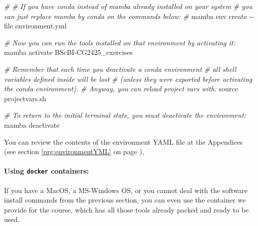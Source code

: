 \documentclass[10pt,a4paper,]{article}
\newenvironment{Shaded}{}{}
\newcommand{\BuiltInTok}[1]{#1}
\newcommand{\CommentTok}[1]{\textcolor[rgb]{0.38,0.63,0.69}{\textit{#1}}}
\newcommand{\ExtensionTok}[1]{#1}
\newcommand{\NormalTok}[1]{#1}
\begin{document}
\begin{Shaded}
\begin{Highlighting}[]
\CommentTok{\#}
\CommentTok{\# If you have conda instead of mamba already installed on your system}
\CommentTok{\# you can just replace \textquotesingle{}mamba\textquotesingle{} by \textquotesingle{}conda\textquotesingle{} on the commands below:}
\CommentTok{\#}
\ExtensionTok{mamba}\NormalTok{ env create {-}{-}file environment.yml}

\CommentTok{\# Now you can run the tools installed on that environment by activating it:}
\ExtensionTok{mamba}\NormalTok{ activate BScBI{-}CG2425\_exercises}

\CommentTok{\# Remember that each time you deactivate a conda environment}
\CommentTok{\# all shell variables defined inside will be lost}
\CommentTok{\# (unless they were exported before activating the conda environment).}
\CommentTok{\# Anyway, you can reload project vars with:}
\BuiltInTok{source}\NormalTok{ projectvars.sh}

\CommentTok{\# To return to the initial terminal state, you must deactivate the environment:}
\ExtensionTok{mamba}\NormalTok{ deactivate}
\end{Highlighting}
\end{Shaded}

You can review the contents of the environment YAML file at the
Appendices (see section \ref{prg:environmentYML} on page
\pageref{prg:environmentYML}),

\hypertarget{using-docker-containers}{%
\paragraph{\texorpdfstring{Using \texttt{docker}
containers:}{Using docker containers:}}\label{using-docker-containers}}

If you have a MacOS, a MS-Windows OS, or you cannot deal with the
software install commands from the previous section, you can even use
the container we provide for the course, which has all those tools
already packed and ready to be used.
\end{document}
